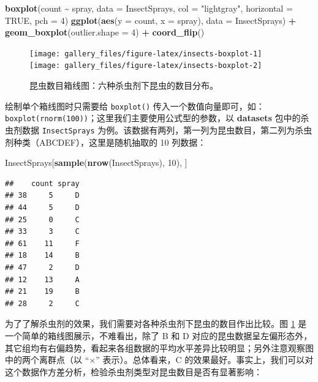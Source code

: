 \documentclass[
  b5paper,
  UTF8,twoside]{book}
\newenvironment{Shaded}{\begin{snugshade}}{\end{snugshade}}
\newcommand{\AttributeTok}[1]{\textcolor[rgb]{0.13,0.29,0.53}{#1}}
\newcommand{\ConstantTok}[1]{\textcolor[rgb]{0.56,0.35,0.01}{#1}}
\newcommand{\DecValTok}[1]{\textcolor[rgb]{0.00,0.00,0.81}{#1}}
\newcommand{\FunctionTok}[1]{\textcolor[rgb]{0.13,0.29,0.53}{\textbf{#1}}}
\newcommand{\NormalTok}[1]{#1}
\newcommand{\SpecialCharTok}[1]{\textcolor[rgb]{0.81,0.36,0.00}{\textbf{#1}}}
\newcommand{\StringTok}[1]{\textcolor[rgb]{0.31,0.60,0.02}{#1}}
\begin{document}
\begin{Shaded}
\begin{Highlighting}[]
\FunctionTok{boxplot}\NormalTok{(count }\SpecialCharTok{\textasciitilde{}}\NormalTok{ spray, }\AttributeTok{data =}\NormalTok{ InsectSprays,}
        \AttributeTok{col =} \StringTok{"lightgray"}\NormalTok{, }\AttributeTok{horizontal =} \ConstantTok{TRUE}\NormalTok{, }\AttributeTok{pch =} \DecValTok{4}\NormalTok{)}
\FunctionTok{ggplot}\NormalTok{(}\FunctionTok{aes}\NormalTok{(}\AttributeTok{y =}\NormalTok{ count, }\AttributeTok{x =}\NormalTok{ spray), }\AttributeTok{data =}\NormalTok{ InsectSprays) }\SpecialCharTok{+}
  \FunctionTok{geom\_boxplot}\NormalTok{(}\AttributeTok{outlier.shape =} \DecValTok{4}\NormalTok{) }\SpecialCharTok{+}
  \FunctionTok{coord\_flip}\NormalTok{()}
\end{Highlighting}
\end{Shaded}

\begin{figure}

{\centering \texttt{[image: gallery\_files/figure-latex/insects-boxplot-1]} \texttt{[image: gallery\_files/figure-latex/insects-boxplot-2]} 

}

\caption[各种杀虫剂下昆虫数目的箱线图]{昆虫数目箱线图：六种杀虫剂下昆虫的数目分布。}\label{fig:insects-boxplot}
\end{figure}

绘制单个箱线图时只需要给 \texttt{boxplot()} 传入一个数值向量即可，如：\texttt{boxplot(rnorm(100))}；这里我们主要使用公式型的参数，以 \textbf{datasets} 包中的杀虫剂数据 \texttt{InsectSprays} 为例。该数据有两列，第一列为昆虫数目，第二列为杀虫剂种类（ABCDEF），这里是随机抽取的 10 列数据：

\begin{Shaded}
\begin{Highlighting}[]
\NormalTok{InsectSprays[}\FunctionTok{sample}\NormalTok{(}\FunctionTok{nrow}\NormalTok{(InsectSprays), }\DecValTok{10}\NormalTok{), ]}
\end{Highlighting}
\end{Shaded}

\begin{verbatim}
##    count spray
## 38     5     D
## 44     5     D
## 25     0     C
## 33     3     C
## 61    11     F
## 18    14     B
## 47     2     D
## 12    13     A
## 21    19     B
## 28     2     C
\end{verbatim}

为了了解杀虫剂的效果，我们需要对各种杀虫剂下昆虫的数目作出比较。图 \ref{fig:insects-boxplot} 是一个简单的箱线图展示，不难看出，除了 B 和 D 对应的昆虫数据呈左偏形态外，其它组均有右偏趋势，看起来各组数据的平均水平差异比较明显；另外注意观察图中的两个离群点（以 ``\(\times\)'' 表示）。总体看来，C 的效果最好。事实上，我们可以对这个数据作方差分析，检验杀虫剂类型对昆虫数目是否有显著影响：
\end{document}

